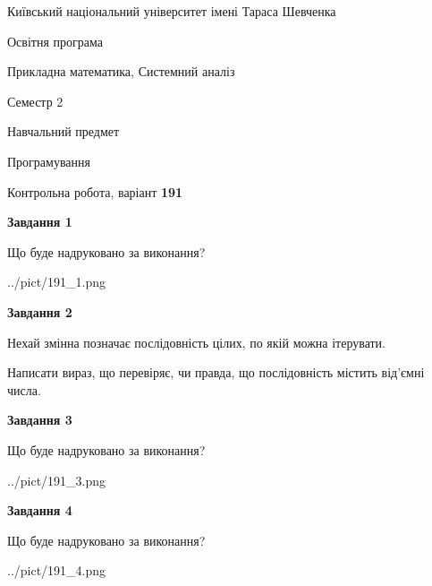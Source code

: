 \documentclass[12pt, ukrainian]{article}
\begin{document}
{{\begin {small}\par
{ \center  Київський національний університет імені Тараса Шевченка \par}
{\parbox {5 cm}{Освітня програма \hfill}{\parbox {8 cm}{Прикладна математика, Системний аналіз \hfill}}\parbox {5 cm}{\hfill Семестр 2}}\par
{\parbox {5 cm} {Навчальний предмет \hfill}\parbox {7 cm}{Програмування \hfill}\parbox {6cm}{\hfill}\par}\vspace{-7pt} \end{small}}{\center Контрольна робота, варіант  \No \textbf
{ 191 }\par}}
{
\begin {large}
{\begin {center}\textbf{Завдання 1}\end {center}}\par
Що буде надруковано за виконання?\par\par
\begin{center}
	{../pict/191_1.png}
\end{center}
\newpage

{\begin {center}\textbf{Завдання 2}\end {center}}\par
Нехай змінна  позначає послідовність цілих, по якій можна ітерувати.

Написати вираз, що перевіряє, чи правда, що послідовність  містить від’ємні числа.\par
\newpage

{\begin {center}\textbf{Завдання 3}\end {center}}\par
Що буде надруковано за виконання?
\begin{center}
	{../pict/191_3.png}
\end{center}
\newpage

{\begin {center}\textbf{Завдання 4}\end {center}}\par
Що буде надруковано за виконання?\par
\begin{center}
	{../pict/191_4.png}
\end{center}
\newpage


\end{large}}
\end{document}

